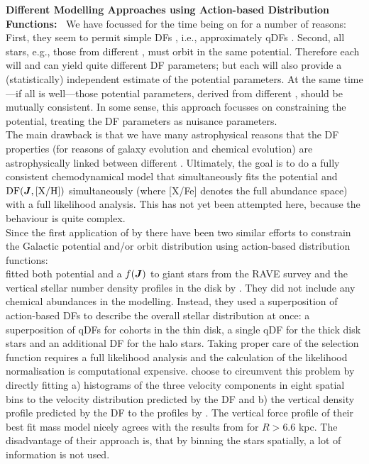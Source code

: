 {\bf Different Modelling Approaches using Action-based Distribution Functions:~} We have focussed for the time being on \MAPs{} for a number of reasons: First, they seem to permit simple DFs \citep{bov12b,bov12c,2012ApJ...753..148B}, i.e., approximately qDFs \citep{2013MNRAS.434..652T}. Second, all stars, e.g., those from different \MAPs{}, must orbit in the same potential. Therefore each \MAP{} will and can yield quite different DF parameters; but each \MAP{} will also provide a (statistically) independent estimate of the potential parameters. At the same time---if all is well---those potential parameters, derived from different \MAPs{}, should be mutually consistent. In some sense, this approach focusses on constraining the potential, treating the DF parameters as nuisance parameters.
\\The main drawback is that we have many astrophysical reasons that the DF properties (for reasons of galaxy evolution and chemical evolution) are astrophysically linked between different \MAPs{}. Ultimately, the goal is to do a fully consistent chemodynamical model that simultaneously fits the potential and $\text{DF}(\boldsymbol{J},\text{[X/H]})$ simultaneously (where [X/Fe] denotes the full abundance space) with a full likelihood analysis. This has not yet been attempted here, because the behaviour is quite complex. 
\\Since the first application of \RM{} by \citet{2013ApJ...779..115B} there have been two similar efforts to constrain the Galactic potential and/or orbit distribution using action-based distribution functions:
\\\citet{2014MNRAS.445.3133P} fitted both potential and a $f(\boldsymbol{J})$ to giant stars from the RAVE survey \citep{2006AJ....132.1645S} and the vertical stellar number density profiles in the disk by \citet{2008ApJ...673..864J}. They did not include any chemical abundances in the modelling. Instead, they used a superposition of action-based DFs to describe the overall stellar distribution at once: a superposition of qDFs for cohorts in the thin disk, a single qDF \Wilma{[TO DO: CHECK]} for the thick disk stars and an additional DF for the halo stars. Taking proper care of the selection function requires a full likelihood analysis and the calculation of the likelihood normalisation is computational expensive. \citet{2014MNRAS.445.3133P} choose to circumvent this problem by directly fitting a) histograms of the three velocity components in eight spatial bins to the velocity distribution predicted by the DF and b) the vertical density profile predicted by the DF to the profiles by \citet{2008ApJ...673..864J}. The vertical force profile of their best fit mass model nicely agrees with the results from \citet{2013ApJ...779..115B} for $R>6.6$ kpc. The disadvantage of their approach is, that by binning the stars spatially, a lot of information is not used.
